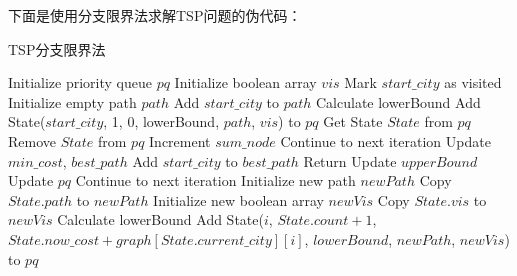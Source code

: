 \documentclass[lang=cn,11pt,a4paper]{elegantpaper}
\begin{document}
下面是使用分支限界法求解TSP问题的伪代码：

\begin{algorithm}[H]
\caption{TSP分支限界法}
\begin{algorithmic}[1]


\State Initialize priority queue $pq$ 
\State Initialize boolean array $vis$ 
\State Mark $start\_city$ as visited 
\State Initialize empty path $path$ 
\State Add $start\_city$ to $path$ 
\State Calculate lowerBound 
\State Add State($start\_city$, 1, 0, lowerBound, $path$, $vis$) to $pq$ 
    \State Get State $State$ from $pq$ 
    \State Remove $State$ from $pq$
    \State Increment $sum\_node$ 
     
        \State Continue to next iteration
    \EndIf
     
            \State Update $min\_cost$, $best\_path$
            \State Add $start\_city$ to $best\_path$
             
                \State Return
            \EndIf
             
               \State Update $upperBound$
               \State Update $pq$
            \EndIf
        \EndIf
        \State Continue to next iteration
    \EndIf
            \State Initialize new path $newPath$ 
            \State Copy $State.path$ to $newPath$ 
            \State Initialize new boolean array $newVis$ 
            \State Copy $State.vis$ to $newVis$ 
            \State Calculate lowerBound
             
                \State Add State($i$, $State.count + 1$, $State.now\_cost + graph[State.current\_city][i]$, $lowerBound$, $newPath$, $newVis$) to $pq$
            \EndIf
        \EndIf
    \EndFor
\EndWhile

\end{algorithmic}
\end{algorithm}
\end{document}
